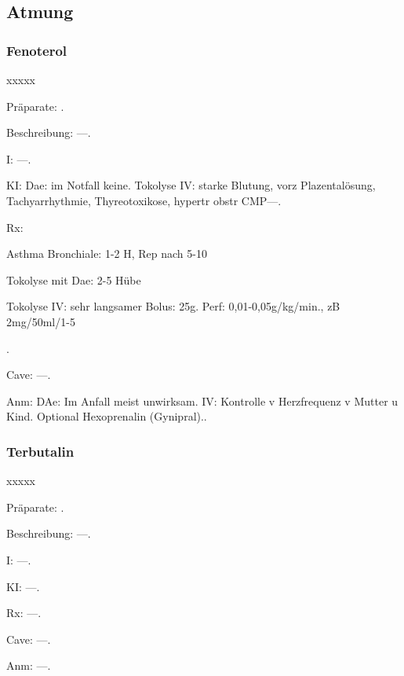 \subsection{Atmung}

\subsubsection{Fenoterol}

\begin{labeling}[~]{xxxxx}
  \item[Präparate:] .
  \item[Beschreibung:] ---.
  \item[I:] ---.
  \item[KI:]  Dae: im Notfall keine. Tokolyse IV: starke Blutung, vorz
  Plazentalösung, Tachyarrhythmie, Thyreotoxikose, hypertr obstr CMP---.
  \item[Rx:]
  \begin{inparaitem}
    \item Asthma Bronchiale: 1-2 H, Rep nach 5-10{\textquotesingle}
    \item Tokolyse mit Dae: 2-5 Hübe
    \item Tokolyse IV: sehr langsamer Bolus: 25{\textmu}g. 
    Perf: 0,01-0,05{\textmu}g/kg/min., zB 2mg/50ml/1-5
  \end{inparaitem}.
  \item[Cave:]   ---.
  \item[Anm:]   DAe: Im Anfall meist unwirksam. IV: Kontrolle v Herzfrequenz v Mutter u
  Kind. Optional Hexoprenalin (Gynipral)..
\end{labeling}



\subsubsection{Terbutalin}

\begin{labeling}[~]{xxxxx}
  \item[Präparate:]  .
  \item[Beschreibung:] ---.
  \item[I:] ---.
  \item[KI:] ---.
  \item[Rx:] ---.
  \item[Cave:] ---.
  \item[Anm:] ---.
\end{labeling}



